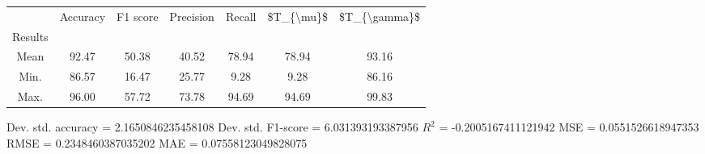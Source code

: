 \begin{tabular}{|c|c|c|c|c|c|c|}
\toprule
{} &  Accuracy &  F1 score &  Precision &  Recall &  \$T\_\{\textbackslash mu\}\$ &  \$T\_\{\textbackslash gamma\}\$ \\
Results &           &           &            &         &            &               \\
\hline
Mean    &     92.47 &     50.38 &      40.52 &   78.94 &      78.94 &         93.16 \\
Min.    &     86.57 &     16.47 &      25.77 &    9.28 &       9.28 &         86.16 \\
Max.    &     96.00 &     57.72 &      73.78 &   94.69 &      94.69 &         99.83 \\
\bottomrule
\end{tabular}

 Dev. std. accuracy = 2.1650846235458108
 Dev. std. F1-score = 6.031393193387956
 $R^2$ = -0.2005167411121942
 MSE = 0.0551526618947353
 RMSE = 0.2348460387035202
 MAE = 0.07558123049828075